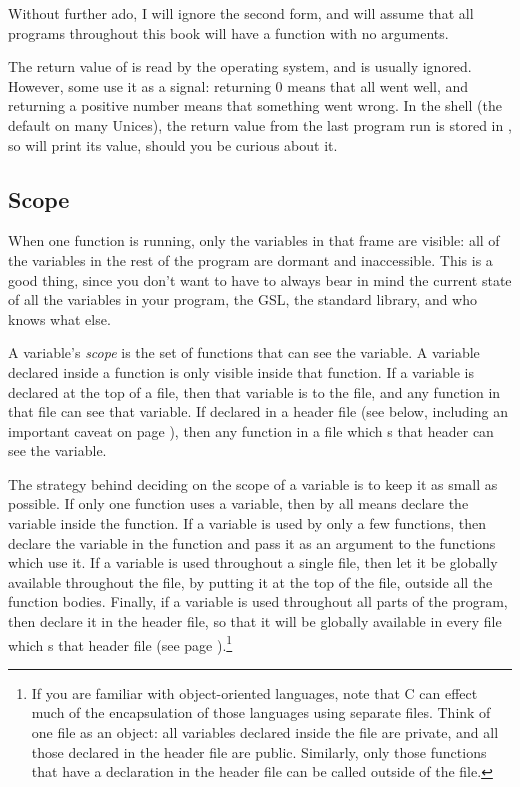 Without further ado, I will ignore the second form, and will assume that
all programs throughout this book will have a  function
with no arguments.

The return value of  is read by the operating system,
and is usually ignored. However, some use it as a signal:  returning
0 means that all went well, and returning a positive number means that
something went wrong. In the  shell (the default on many
Unices), the return value from the last program run is stored in
, so  will print its value, should you
be curious about it.

\subsection{Scope}	\label{scope}

When one function is running, only the variables in that frame are
visible: all of the variables in the rest of the program are 
dormant and inaccessible.  This is a good thing, since you 
don't want to have to always bear in mind the current state of all the
variables in your program, the GSL, the standard library, and who knows
what else.

A variable's {\sl scope} is the set of functions that can see the
variable. A variable declared inside a function is only visible inside
that function.  If a variable is declared at the top of a file, then
that variable is  to the file, and any function in that
file can see that variable. If declared in a header file (see below,
including an important caveat on page \pageref{extern}),
then any function in a file which s that header  can see
the variable.

The strategy behind deciding on the scope of a variable is
to keep it as small as possible. If only one function uses a variable,
then by all means declare the variable inside the function.
If a variable is used by only a few functions,
then declare the variable in the  function and pass it as an
argument to the functions which use it. If a variable is used throughout
a single file, then let it be globally available throughout the file, by
putting it at the top of the file, outside all the function bodies. Finally,
if a variable is used throughout all parts of the program, then declare it in
the header file, so that it will be globally available in every
file which s that header file (see page \pageref{fileglobal}).\footnote{If
you are familiar with object-oriented languages, note that C can effect
much of the encapsulation of those languages using separate files. Think
of one file as an object: all variables declared inside the file are
private, and all those declared in the header file are public. Similarly,
only those functions that have a declaration in the header file can be
called outside of the file.}

